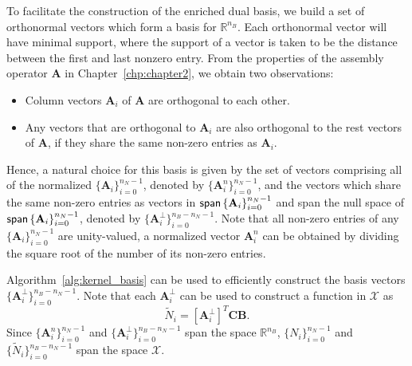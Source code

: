 To facilitate the construction of the enriched dual basis, we build a set of orthonormal vectors which form a basis for $\mathbb{R}^{n_B}$. Each orthonormal vector will have minimal support, where the support of a vector is taken to be the distance between the first and last nonzero entry. From the properties of the assembly operator $\mathbf{A}$ in Chapter~\ref{chp:chapter2}, we obtain two observations:
\begin{itemize}
	\item Column vectors $\mathbf{A}_i$ of $\mathbf{A}$ are orthogonal to each other.
	\item Any vectors that are orthogonal to $\mathbf{A}_i$ are also orthogonal to the rest vectors of $\mathbf{A}$, if they share the same non-zero entries as $\mathbf{A}_i$.
\end{itemize} 
Hence, a natural choice for this basis is given by the set of vectors comprising all of the normalized $\{\mathbf{A}_i\}_{i=0}^{n_N-1}$, denoted by $\{\mathbf{A}^n_i\}_{i=0}^{n_N-1}$, and the vectors which share the same non-zero entries as vectors in $\operatorname{\mathsf{span}}\left\{\mathbf{A}_i\right\}_{i=0}^{n_N-1}$ and span the null space of $\operatorname{\mathsf{span}}\left\{\mathbf{A}_i\right\}_{i=0}^{n_N-1}$, denoted by $\{\mathbf{A}^\perp_i\}_{i=0}^{n_B-n_N-1}$. Note that all non-zero entries of any $\{\mathbf{A}_i\}_{i=0}^{n_N-1}$ are unity-valued, a normalized vector $\mathbf{A}^n_i$ can be obtained by dividing the square root of the number of its non-zero entries.\par

Algorithm~\ref{alg:kernel_basis} can be used to efficiently construct the basis vectors $\{\mathbf{A}^\perp_i\}_{i=0}^{n_B-n_N-1}$. Note that each $\mathbf{A}^\perp_i$ can be used to construct a function in $\mathcal{X}$ as
\begin{equation}
	\tilde{N}_i=\left[\mathbf{A}^\perp_i\right]^T \mathbf{CB}.\label{eq:tidle-spline-basis}
\end{equation}
Since $\{\mathbf{A}^n_i\}_{i=0}^{n_N-1}$ and $\{\mathbf{A}^\perp_i\}_{i=0}^{n_B-n_N-1}$ span the space $\mathbb{R}^{n_B}$, $\{N_i\}_{i=0}^{n_N-1}$ and $\{\tilde{N}_i\}_{i=0}^{n_B-n_N-1}$ span the space $\mathcal{X}$.\par


